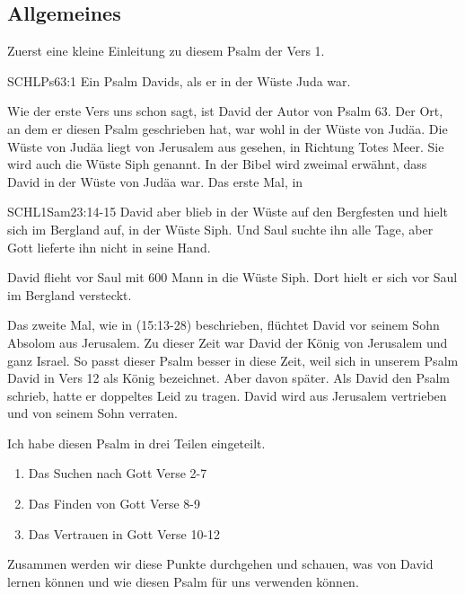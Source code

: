 \documentclass[14pt]{mybib}
\begin{document}
    \subsection*{Allgemeines}
    \begin{otsblock}[Allgemeines]
    Zuerst eine kleine Einleitung zu diesem Psalm der Vers 1.
        \begin{bibelbox}{SCHL}{Ps}{63:1}
            Ein Psalm Davids, als er in der Wüste Juda war.
        \end{bibelbox}
    Wie der erste Vers uns schon sagt, ist David der Autor von Psalm 63. Der Ort, an dem er diesen Psalm geschrieben hat, war wohl in der Wüste von Judäa. Die Wüste von Judäa liegt von Jerusalem aus gesehen, in Richtung Totes Meer. Sie wird auch die Wüste Siph genannt. In der Bibel wird zweimal erwähnt, dass David in der Wüste von Judäa war. Das erste Mal, in     
    \begin{bibelbox}{SCHL}{1Sam}{23:14-15}
        David aber blieb in der Wüste auf den Bergfesten und hielt sich im Bergland auf, in der Wüste Siph. Und Saul suchte ihn alle Tage, aber Gott lieferte ihn nicht in seine Hand.
    \end{bibelbox}    
    David flieht vor Saul mit 600 Mann in die Wüste Siph. Dort hielt er sich vor Saul im Bergland versteckt.
    
    Das zweite Mal, wie in (15:13-28) beschrieben, flüchtet David vor seinem Sohn Absolom aus Jerusalem. Zu dieser Zeit war David der König von Jerusalem und ganz Israel. So passt dieser Psalm besser in diese Zeit, weil sich in unserem Psalm David in Vers 12 als König bezeichnet. Aber davon später. Als David den Psalm schrieb, hatte er doppeltes Leid zu tragen. David wird aus Jerusalem vertrieben und von seinem Sohn verraten.
    \end{otsblock}
    \begin{otsblock}
        Ich habe diesen Psalm in drei Teilen eingeteilt. 
        \begin{enumerate}
            \item Das Suchen nach Gott Verse 2-7
            \item Das Finden von Gott Verse 8-9
            \item Das Vertrauen in Gott Verse 10-12
        \end{enumerate}
        Zusammen werden wir diese Punkte durchgehen und schauen, was  von David lernen können und wie  diesen Psalm für uns verwenden können.
    \end{otsblock}
\end{document}
